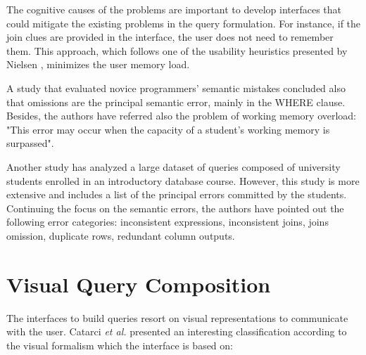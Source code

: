 The cognitive causes of the problems are important to develop interfaces that could mitigate the existing problems in the query formulation. For instance, if the join clues are provided in the interface, the user does not need to remember them. This approach, which follows one of the usability heuristics presented by Nielsen \cite{usabilityEngineering}, minimizes the user memory load.

A study that evaluated novice programmers' semantic mistakes concluded also that omissions are the principal semantic error, mainly in the WHERE clause. \cite{studentsSemanticMistakesInWritingSevenDifferentTypesOfSQLQueries} Besides, the authors have referred also the problem of working memory overload: "This error may occur when the capacity of a student’s working memory is surpassed".

Another study has analyzed a large dataset of queries composed of university students enrolled in an introductory database course. However, this study is more extensive and includes a list of the principal errors committed by the students. \cite{errorsAndComplicationsInSQLQueryFormulation} Continuing the focus on the semantic errors, the authors have pointed out the following error categories: inconsistent expressions, inconsistent joins, joins omission, duplicate rows, redundant column outputs. \cite{errorsAndComplicationsInSQLQueryFormulation}


\section{Visual Query Composition}
\label{sec:visual_query_composition}

The interfaces to build queries resort on visual representations to communicate with the user. Catarci \textit{et al.} \cite{visualQuerySystemsForDatabases_aSurvey} presented an interesting classification according to the visual formalism which the interface is based on:

